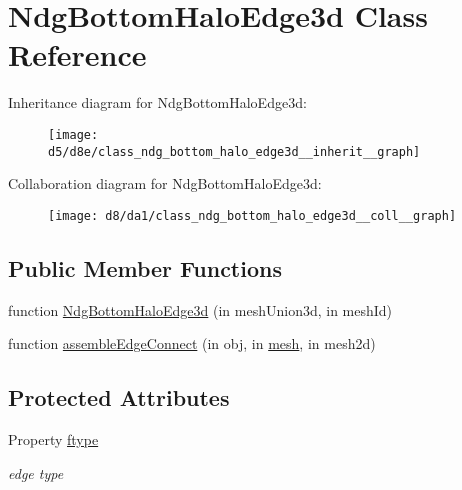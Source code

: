 \hypertarget{class_ndg_bottom_halo_edge3d}{}\section{Ndg\+Bottom\+Halo\+Edge3d Class Reference}
\label{class_ndg_bottom_halo_edge3d}


Inheritance diagram for Ndg\+Bottom\+Halo\+Edge3d\+:
\nopagebreak
\begin{figure}[H]
\begin{center}
\leavevmode
\texttt{[image: d5/d8e/class\_ndg\_bottom\_halo\_edge3d\_\_inherit\_\_graph]}
\end{center}
\end{figure}


Collaboration diagram for Ndg\+Bottom\+Halo\+Edge3d\+:
\nopagebreak
\begin{figure}[H]
\begin{center}
\leavevmode
\texttt{[image: d8/da1/class\_ndg\_bottom\_halo\_edge3d\_\_coll\_\_graph]}
\end{center}
\end{figure}
\subsection*{Public Member Functions}
\begin{DoxyCompactItemize}
\item 
function \hyperlink{class_ndg_bottom_halo_edge3d_afa470b6bcdb46436fa69b62a28a6955a}{Ndg\+Bottom\+Halo\+Edge3d} (in mesh\+Union3d, in mesh\+Id)
\item 
function \hyperlink{class_ndg_bottom_halo_edge3d_aec903b2c42599122a2d2eb79776274ae}{assemble\+Edge\+Connect} (in obj, in \hyperlink{class_ndg_bottom_inner_edge3d_a19345b1da21dfbe0866a8b543ecbb5d4}{mesh}, in mesh2d)
\end{DoxyCompactItemize}
\subsection*{Protected Attributes}
\begin{DoxyCompactItemize}
\item 
Property \hyperlink{class_ndg_bottom_halo_edge3d_ae3c3064a8a581f8a9eb4c6024d15b3ba}{ftype}
\begin{DoxyCompactList}\small\item\em edge type \end{DoxyCompactList}\end{DoxyCompactItemize}


